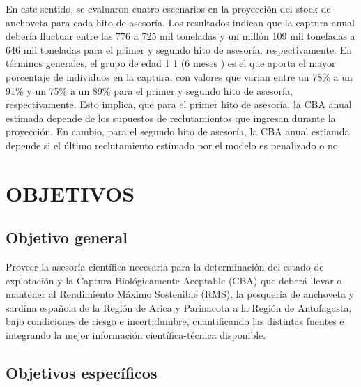 \documentclass[letter,11pt]{article}
\begin{document}
En este sentido, se evaluaron cuatro escenarios en la proyecci\'on del
stock de anchoveta para cada hito de asesor\'ia. Los resultados indican
que la captura anual deber\'ia fluctuar entre las 776 a 725 mil toneladas
y un mill\'on 109 mil toneladas a 646 mil toneladas para el primer y segundo
hito de asesor\'ia, respectivamente. En t\'erminos generales, el grupo de edad 1
1 (6 meses ) es el que aporta el mayor porcentaje de individuos en la captura, con
valores que varian entre un 78\% a un 91\% y un 75\% a un 89\% para el primer y segundo
hito de asesor\'ia, respectivamente. Esto implica, que para el primer hito de asesor\'ia,
la CBA anual estimada depende de los supuestos de reclutamientos que ingresan durante la
proyecci\'on. En cambio, para el segundo hito de asesor\'ia, la CBA anual estiamda depende 
si el \'ultimo reclutamiento estimado por el modelo es penalizado o no.


\clearpage
\pagebreak

\section{OBJETIVOS}

\subsection{Objetivo general}

Proveer la asesor\'ia cient\'ifica necesaria para la determinaci\'on del
estado de explotaci\'on y la Captura Biol\'ogicamente Aceptable (CBA) que
deber\'a llevar o mantener al Rendimiento M\'aximo Sostenible (RMS), la
pesquer\'ia de anchoveta y sardina espa\~{n}ola de la Regi\'on de Arica y
Parinacota a la Regi\'on de Antofagasta, bajo condiciones de riesgo e
incertidumbre, cuantificando las distintas fuentes e integrando la mejor
informaci\'on cient\'ifica-t\'ecnica disponible.

\subsection{Objetivos espec\'ificos}
\end{document}
